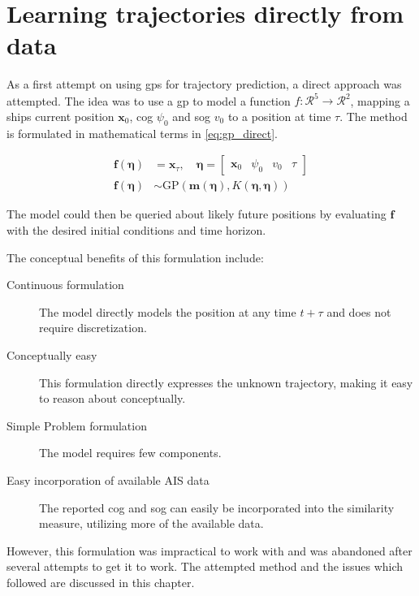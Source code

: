 \chapter{Learning trajectories directly from data}
As a first attempt on using \acrshort{gp}s for trajectory prediction, a direct approach was attempted. The idea was to use a \acrshort{gp} to model a function $f: \mathcal{R}^5 \to \mathcal{R}^2$, mapping a ships current position $\boldsymbol{x}_0$, \acrshort{cog} $\psi_0$ and \acrshort{sog} $v_0$ to a position at time $\tau$. The method is formulated in mathematical terms in \cref{eq:gp_direct}. 

\begin{subequations}\label{eq:gp_direct}
\begin{align}
    \boldsymbol{f}(\boldsymbol{\eta}) &= \boldsymbol{x}_{\tau} \label{eq:gp_direct_f}, \quad \boldsymbol{\eta} = \begin{bmatrix} \boldsymbol{x}_0 & \psi_0 & v_0 & \tau\end{bmatrix}\\
    \boldsymbol{f}(\boldsymbol{\eta}) &\sim \text{GP}(\boldsymbol{m}(\boldsymbol{\eta}), K(\boldsymbol{\eta}, \boldsymbol{\eta}))\label{eq:gp_direct_f_dist}
\end{align} 
\end{subequations}

The model could then be queried about likely future positions by evaluating $\boldsymbol{f}$ with the desired initial conditions and time horizon. 

The conceptual benefits of this formulation include:
\begin{description}
    \item[Continuous formulation] The model directly models the position at any time $t+\tau$ and does not require discretization. 
    \item[Conceptually easy] This formulation directly expresses the unknown trajectory, making it easy to reason about conceptually.
    \item[Simple Problem formulation] The model requires few components.
    \item[Easy incorporation of available AIS data] The reported \acrshort{cog} and \acrshort{sog} can easily be incorporated into the similarity measure, utilizing more of the available data.
\end{description}

However, this formulation was impractical to work with and was abandoned after several attempts to get it to work. The attempted method and the issues which followed are discussed in this chapter.


